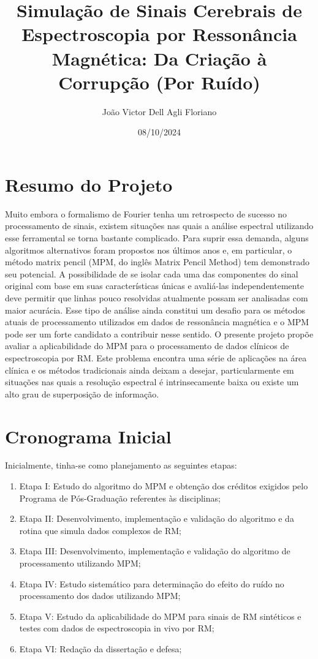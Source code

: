 \documentclass{article}
\title{ Simulação de Sinais Cerebrais de Espectroscopia por 
Ressonância Magnética: Da Criação à Corrupção (Por Ruído)}
\author{João Victor Dell Agli Floriano}
\date{08/10/2024}
\begin{document}
\maketitle
\section{Resumo do Projeto}

Muito embora o formalismo de Fourier tenha um retrospecto de sucesso no
processamento de sinais, existem situações nas quais a análise espectral utilizando
esse ferramental se torna bastante complicado. Para suprir essa demanda, alguns
algoritmos alternativos foram propostos nos últimos anos e, em particular, o método
matrix pencil (MPM, do inglês Matrix Pencil Method) tem demonstrado seu potencial.
A possibilidade de se isolar cada uma das componentes do sinal original com base
em suas características únicas e avaliá-las independentemente deve permitir que
linhas pouco resolvidas atualmente possam ser analisadas com maior acurácia.
Esse tipo de análise ainda constitui um desafio para os métodos atuais de
processamento utilizados em dados de ressonância magnética e o MPM pode ser
um forte candidato a contribuir nesse sentido. O presente projeto propõe avaliar a
aplicabilidade do MPM para o processamento de dados clínicos de espectroscopia
por RM. Este problema encontra uma série de aplicações na área clínica e os
métodos tradicionais ainda deixam a desejar, particularmente em situações nas
quais a resolução espectral é intrinsecamente baixa ou existe um alto grau de
superposição de informação.

\section{Cronograma Inicial}

Inicialmente, tinha-se como planejamento as seguintes etapas:

\begin{enumerate}
    \item  Etapa I: Estudo do algoritmo do MPM e obtenção dos créditos exigidos pelo
    Programa de Pós-Graduação referentes às disciplinas;
    \item  Etapa II: Desenvolvimento, implementação e validação do algoritmo e da
    rotina que simula dados complexos de RM;
    \item  Etapa III: Desenvolvimento, implementação e validação do algoritmo de
    processamento utilizando MPM;
    \item  Etapa IV: Estudo sistemático para determinação do efeito do ruído no
    processamento dos dados utilizando MPM;
    \item  Etapa V: Estudo da aplicabilidade do MPM para sinais de RM sintéticos e
    testes com dados de espectroscopia in vivo por RM;
    \item  Etapa VI: Redação da dissertação e defesa;
\end{enumerate}
\end{document}
